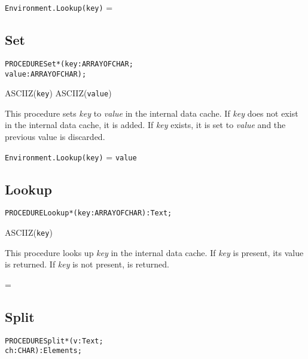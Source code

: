 \begin{postcondition}
  \texttt{Environment.Lookup(key)} = \nil
\end{postcondition}


\subsection{Set}\label{environment:set}
\begin{alltt}
  PROCEDURE Set*(key   : ARRAY OF CHAR;
                 value : ARRAY OF CHAR);
\end{alltt}

\begin{precondition}
  ASCIIZ(\texttt{key}) \logicaland ASCIIZ(\texttt{value})
\end{precondition}

\begin{semantics}
This procedure sets \emph{key} to \emph{value} in the internal data
cache.  If \emph{key} does not exist in the internal data cache, it is
added.  If \emph{key} exists, it is set to \emph{value} and the
previous value is discarded.
\end{semantics}

\begin{postcondition}
  \texttt{Environment.Lookup(key)\deref} = \texttt{value}
\end{postcondition}


\subsection{Lookup}\label{environment:lookup}
\begin{alltt}
  PROCEDURE Lookup*(key : ARRAY OF CHAR) : Text;
\end{alltt}

\begin{precondition}
  ASCIIZ(\texttt{key})
\end{precondition}

\begin{semantics}
This procedure looks up \emph{key} in the internal data cache.  If
\emph{key} is present, its value is returned.  If \emph{key} is not
present, \nil is returned.
\end{semantics}

\begin{postcondition}
  \result = \nil \logicalor \validfn{\result\deref}
\end{postcondition}


\subsection{Split}\label{environment:split}
\begin{alltt}
  PROCEDURE Split*(v  : Text;
                   ch : CHAR) : Elements;
\end{alltt}

